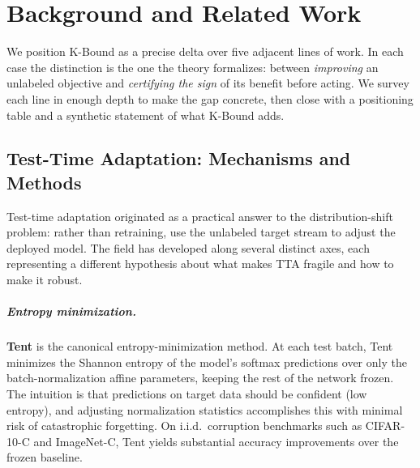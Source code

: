 
\chapter{Background and Related Work}\label{ch:related}

We position K-Bound as a precise delta over five adjacent lines of work.
In each case the distinction is the one the theory formalizes: between
\emph{improving} an unlabeled objective and \emph{certifying the sign} of
its benefit before acting.
We survey each line in enough depth to make the gap concrete, then close
with a positioning table and a synthetic statement of what K-Bound adds.

\section{Test-Time Adaptation: Mechanisms and Methods}\label{sec:rel-tta}

Test-time adaptation originated as a practical answer to the distribution-shift
problem: rather than retraining, use the unlabeled target stream to adjust the
deployed model.
The field has developed along several distinct axes, each representing a
different hypothesis about what makes TTA fragile and how to make it robust.

\paragraph{Entropy minimization.}
\textbf{Tent} \cite{wang2021tent} is the canonical entropy-minimization method.
At each test batch, Tent minimizes the Shannon entropy of the model's softmax
predictions over only the batch-normalization affine parameters, keeping the
rest of the network frozen.
The intuition is that predictions on target data should be confident
(low entropy), and adjusting normalization statistics accomplishes this with
minimal risk of catastrophic forgetting.
On i.i.d.\ corruption benchmarks such as CIFAR-10-C
\cite{hendrycks2019benchmarking} and ImageNet-C, Tent yields substantial
accuracy improvements over the frozen baseline.

